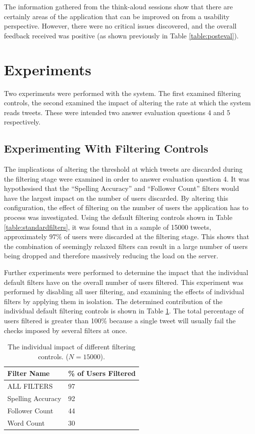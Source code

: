 \documentclass{l4proj}
\begin{document}
The information gathered from the think-aloud sessions show that there are certainly areas of the application that can be improved on from a usability perspective. However, there were no critical issues discovered, and the overall feedback received was positive (as shown previously in Table \ref{table:posteval}).

\section{Experiments}

Two experiments were performed with the system. The first examined filtering controls, the second examined the impact of altering the rate at which the system reads tweets. These were intended two answer evaluation questions 4 and 5 respectively. 
    
    \subsection{Experimenting With Filtering Controls}
    The implications of altering the threshold at which tweets are discarded during the filtering stage were examined in order to answer evaluation question 4. It was hypothesised that the ``Spelling Accuracy'' and ``Follower Count'' filters would have the largest impact on the number of users discarded. By altering this configuration, the effect of filtering on the number of users the application has to process was investigated. Using the default filtering controls shown in Table \ref{table:standardfilters}, it was found that in a sample of 15000 tweets, approximately $97\%$ of users were discarded at the filtering stage. This shows that the combination of seemingly relaxed filters can result in a large number of users being dropped and therefore massively reducing the load on the server. 
    
Further experiments were performed to determine the impact that the individual default filters have on the overall number of users filtered. This experiment was performed by disabling all user filtering, and examining the effects of individual filters by applying them in isolation. The determined contribution of the individual default filtering controls is shown in Table \ref{table:filteringresults}. The total percentage of users filtered is greater than 100\% because a single tweet will usually fail the checks imposed by several filters at once.

\begin{table}[H]
    \centering
    \begin{tabular}{| l | l |}
    \hline
    Filter Name & \% of Users Filtered \\ \hline
    ALL FILTERS & 97 \\ \hline
    Spelling Accuracy & 92  \\ \hline
    Follower Count & 44 \\ \hline
    Word Count & 30 \\
    \hline
    \end{tabular}
    \caption{\label{table:filteringresults}The individual impact of different filtering controls. ($N=15000$).}
\end{table}
\end{document}
